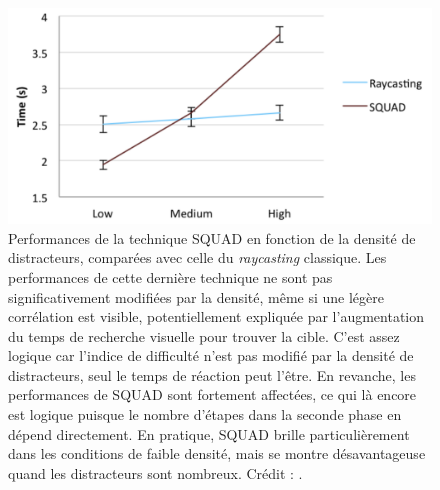 	\begin{figure}[ht]
		\centering
		\includegraphics[width=\textwidth]{figures/ch2/squadDensity}
		\caption[SQUAD --- Résultats : densité]{Performances de la technique SQUAD en fonction de la densité de distracteurs, comparées avec celle du \emph{raycasting} classique. Les performances de cette dernière technique ne sont pas significativement modifiées par la densité, même si une légère corrélation est visible, potentiellement expliquée par l'augmentation du temps de recherche visuelle pour trouver la cible. C'est assez logique car l'indice de difficulté n'est pas modifié par la densité de distracteurs, seul le temps de réaction peut l'être. En revanche, les performances de SQUAD sont fortement affectées, ce qui là encore est logique puisque le nombre d'étapes dans la seconde phase en dépend directement. En pratique, SQUAD brille particulièrement dans les conditions de faible densité, mais se montre désavantageuse quand les distracteurs sont nombreux. Crédit : \cite{kopper2011rapid}.}
		\label{fig:squadDensity}
	\end{figure}
	
